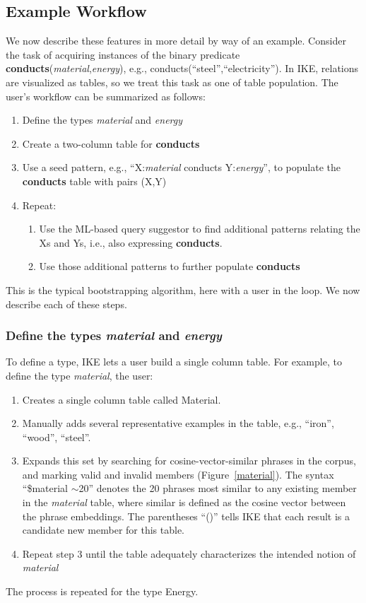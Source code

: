 \documentclass[11pt,letterpaper]{article}
\newcommand{\pred}{\bf}
\begin{document}
\subsection{Example Workflow} \label{sect:IKE-workflow}

We now describe these features in more detail by way of an example. Consider the task of acquiring instances of the binary predicate {\pred conducts}({\it material},{\it energy}), e.g., conducts(``steel'',``electricity''). In IKE, relations are visualized as tables, so we treat this task as one of table population. The user's workflow can be summarized as follows:
\begin{enumerate}[noitemsep]
\item Define the types {\it material} and {\it energy}
\item Create a two-column table for {\pred conducts}
\item Use a seed pattern, e.g., ``X:{\it material} conducts Y:{\it energy}'', to populate the {\pred conducts} table with pairs (X,Y)
\item Repeat:
\begin{enumerate}[noitemsep]
  \item Use the ML-based query suggestor to find additional patterns relating the Xs and Ys, i.e., also expressing {\pred conducts}.
  \item Use those additional patterns to further populate {\pred conducts}
  \end{enumerate}
\end{enumerate}
This is the typical bootstrapping algorithm, here with a user in the loop. We now describe each of these steps.

\subsubsection{Define the types {\it material} and {\it energy}}

To define a type, IKE lets a user build a single column table. For example, to define the type {\it material}, the user:
\begin{enumerate}[noitemsep]
\item Creates a single column table called Material.
\item Manually adds several representative examples in the table, e.g., ``iron'', ``wood'', ``steel''.
\item Expands this set by searching for cosine-vector-similar phrases in the corpus, and marking valid and invalid members (Figure~\ref{material}). The syntax ``\$material $\sim$20'' denotes the 20 phrases most similar to any existing member in the {\it material} table, where similar is defined as the cosine vector between the phrase embeddings.
The parentheses ``()'' tells IKE that each result is a candidate new member for this table.
\item Repeat step 3 until the table adequately characterizes the intended notion of {\it material}
\end{enumerate}
The process is repeated for the type Energy.
\end{document}
